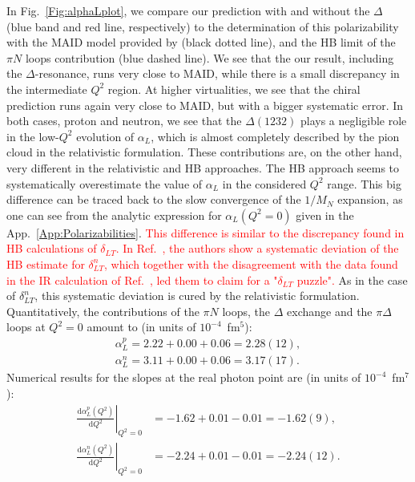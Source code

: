 \documentclass[twocolumn,prc,showpacs,nofootinbib,preprintnumbers,amsmath,amssymb,superscriptaddress]{revtex4-1}
\def\dd{\mathrm{d}}
\begin{document}
In  Fig.~\ref{Fig:alphaLplot}, we compare our prediction with and without the $\Delta$ (blue band and red line, respectively) to the determination of this polarizability with the MAID model \cite{Drechsel:2000ct,Drechsel:1998hk,Drechsel:2002ar} provided by \cite{private-Lothar} (black dotted line), and the HB limit of the $\pi N$ loops contribution (blue dashed line). 
We see that the our result, including the $\Delta$-resonance, runs very close to MAID, while there is a small discrepancy in the intermediate $Q^2$ region.
At higher virtualities, we see that the chiral prediction runs again very close to MAID, but with a bigger systematic error.
In both cases, proton and neutron, we see that the $\Delta(1232)$ plays a negligible role in the low-$Q^2$ evolution of $\alpha_L$, which is almost completely described by the pion cloud in the relativistic formulation.
These contributions are, on the other hand, very different in the relativistic and HB approaches.
The HB approach seems to systematically overestimate the value of $\alpha_L$ in the considered $Q^2$ range. 
This big difference can be traced back to the slow convergence of the $1/M_N$ expansion, as one can see from the analytic expression for $\alpha_L(Q^2=0)$ given in the App.~\ref{App:Polarizabilities}.
\textcolor{red}{This difference is similar to the discrepancy found in HB calculations of $\delta_{LT}$. In Ref.~\cite{Kao:2002cp}, the authors show a systematic deviation of the HB estimate for $\delta_{LT}^{n}$, which together with the disagreement with the data found in the IR calculation of Ref.~\cite{Bernard:2002pw}, led them to claim for a "$\delta_{LT}$ puzzle". }
As in the case of $\delta_{LT}^n$, this systematic deviation is cured by the relativistic formulation.
Quantitatively, the contributions of the $\pi N$ loops, the $\Delta$ exchange and the $\pi\Delta$ loops at $Q^2=0$ amount to (in units of $10^{-4}$~fm$^5$):
\begin{align}
\alpha^p_L= 2.22+ 0.00+  0.06=2.28(12), \\
\alpha^n_L= 3.11 + 0.00+ 0.06 = 3.17(17).
\end{align}
Numerical results for the slopes at the real photon point are (in units of $10^{-4}$~fm$^7$):
\begin{align}
\left.\frac{\dd\alpha^p_L (Q^2)}{\dd Q^2}\right|_{Q^2=0}&=  -1.62 + 0.01 - 0.01 = -1.62(9),  \\
\left.\frac{\dd\alpha^n_L (Q^2)}{\dd Q^2}\right|_{Q^2=0}&= -2.24 + 0.01 - 0.01 = -2.24(12).
\end{align}
\end{document}
